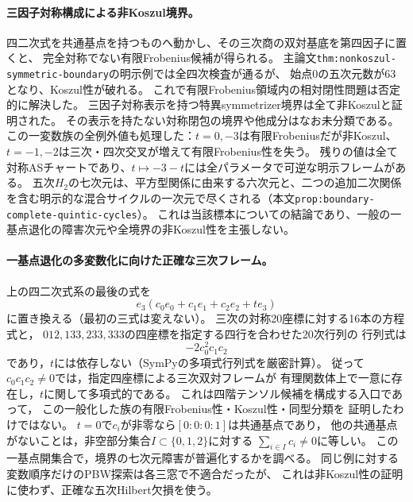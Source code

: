 \documentclass[11pt,a4paper]{ltjsarticle}
\begin{document}
\paragraph{三因子対称構成による非Koszul境界。}
四二次式を共通基点を持つものへ動かし、その三次商の双対基底を第四因子に置くと、
完全対称でない有限Frobenius候補が得られる。
主論文\texttt{thm:nonkoszul-symmetric-boundary}の明示例では全四次検査が通るが、
始点0の五次元数が63となり、Koszul性が破れる。
これで有限Frobenius領域内の相対閉性問題は否定的に解決した。
三因子対称表示を持つ特異symmetrizer境界は全て非Koszulと証明された。
その表示を持たない対称閉包の境界や他成分はなお未分類である。
この一変数族の全例外値も処理した：$t=0,-3$は有限Frobeniusだが非Koszul、
$t=-1,-2$は三次・四次交叉が増えて有限Frobenius性を失う。
残りの値は全て対称ASチャートであり、$t\mapsto-3-t$には全パラメータで可逆な明示フレームがある。
五次$H_2$の七次元は、平方型関係に由来する六次元と、二つの追加二次関係を含む明示的な混合サイクルの一次元で尽くされる（本文\texttt{prop:boundary-complete-quintic-cycles}）。
これは当該標本についての結論であり、一般の一基点退化の障害次元や全境界の非Koszul性を主張しない。

\paragraph{一基点退化の多変数化に向けた正確な三次フレーム。}
上の四二次式系の最後の式を
\[
 e_3(c_0e_0+c_1e_1+c_2e_2+t e_3)
\]
に置き換える（最初の三式は変えない）。
三次の対称20座標に対する16本の方程式と，
$012,133,233,333$の四座標を指定する四行を合わせた20次行列の
行列式は
\[
 \boxed{-2c_0^2c_1c_2}
\]
であり，$t$には依存しない（SymPyの多項式行列式を厳密計算）。
従って$c_0c_1c_2\ne0$では，指定四座標による三次双対フレームが
有理関数体上で一意に存在し，$t$に関して多項式的である。
これは四階テンソル候補を構成する入口であって，
この一般化した族の有限Frobenius性・Koszul性・同型分類を
証明したわけではない。
$t=0$で$c_i$が非零なら$[0:0:0:1]$は共通基点であり，
他の共通基点がないことは，非空部分集合$I\subset\{0,1,2\}$に対する
$\sum_{i\in I}c_i\ne0$に等しい。
この一基点開集合で，境界の七次元障害が普遍化するかを調べる。
同じ例に対する変数順序だけのPBW探索は各三窓で不適合だったが、
これは非Koszul性の証明に使わず、正確な五次Hilbert欠損を使う。
\end{document}
